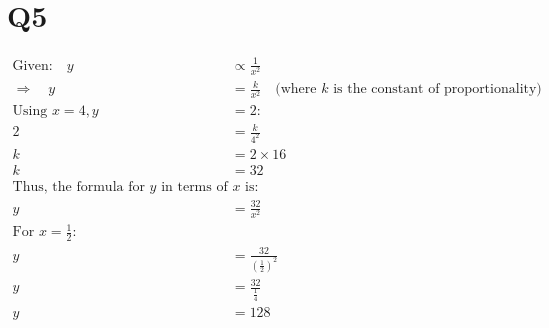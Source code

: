 \documentclass{article}
\begin{document}
\section*{Q5}
\begin{align*}
    \text{Given:} \quad y & \propto \frac{1}{x^2} \\
    \Rightarrow \quad y & = \frac{k}{x^2} \quad \text{(where } k \text{ is the constant of proportionality)} \\
    \text{Using } x = 4, y & = 2: \\
    2 & = \frac{k}{4^2} \\
    k & = 2 \times 16 \\
    k & = 32 \\
    \text{Thus, the formula for } y \text{ in terms of } x \text{ is:} \\
    y & = \frac{32}{x^2} \\
    \text{For } x = \frac{1}{2}: \\
    y & = \frac{32}{\left(\frac{1}{2}\right)^2} \\
    y & = \frac{32}{\frac{1}{4}} \\
    y & = 128 \\
    \end{align*}
    
\end{document}
